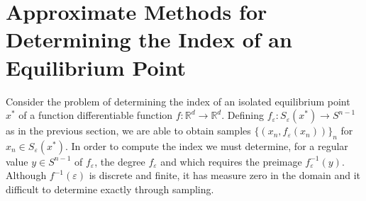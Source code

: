\documentclass[12pt]{article}
\begin{document}
\section{Approximate Methods for Determining the Index of an Equilibrium Point}
Consider the problem of determining the index of an isolated equilibrium point $x^*$ of a function differentiable function $f:\mathbb{R}^d \rightarrow \mathbb{R}^d$. Defining $f_{\varepsilon} : S_{\varepsilon}(x^*) \rightarrow S^{n-1}$ as in the previous section, we are able to obtain samples $\{\left(x_n, f_{\varepsilon}(x_n)\right)\}_{n}$ for $x_n\in S_{\varepsilon}(x^*)$. In order to compute the index we must determine, for a regular value $y \in S^{n-1}$ of $f_{\varepsilon}$, the degree $f_{\varepsilon}$ and which requires the preimage $f_{\varepsilon}^{-1}(y)$. Although $f^{-1}(\varepsilon)$ is discrete and finite, it has measure zero in the domain and it difficult to determine exactly through sampling.
\end{document}
